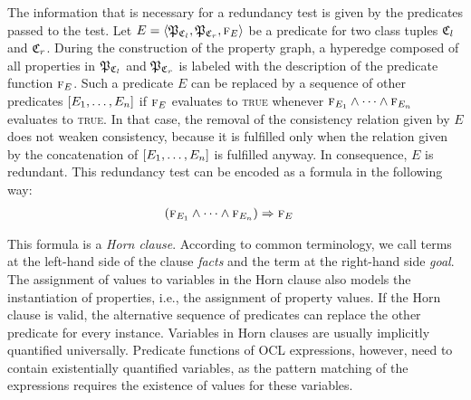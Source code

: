 The information that is necessary for a redundancy test is given by the predicates passed to the test.
Let $E = \tupled{\propertysettuple{P}{\classtuple{C}{l}}, \propertysettuple{P}{\classtuple{C}{r}}, \function{f}_E}$ be a predicate for two class tuples $\classtuple{C}{l}$ and $\classtuple{C}{r}$. 
During the construction of the property graph, a hyperedge composed of all properties in $\propertysettuple{P}{\classtuple{C}{l}}$ and $\propertysettuple{P}{\classtuple{C}{r}}$ is labeled with the description of the predicate function $\textsc{f}_E$.
Such a predicate $E$ can be replaced by a sequence of other predicates $[E_1, \dots, E_n]$ if $\textsc{f}_E$ evaluates to \textsc{true} whenever $\textsc{f}_{E_1} \wedge \dots \wedge \textsc{f}_{E_n}$ evaluates to \textsc{true}.
In that case, the removal of the consistency relation given by $E$ does not weaken consistency, because it is fulfilled only when  the relation given by the concatenation of $[E_1, \dots, E_n]$ is fulfilled anyway.
In consequence, $E$ is redundant.
This redundancy test can be encoded as a formula in the following way:
\begin{align*}
    &
    (\textsc{f}_{E_1} \wedge \dots \wedge \textsc{f}_{E_n}) \Rightarrow \textsc{f}_{E}
\end{align*}

This formula is a \emph{Horn clause}.
According to common terminology, we call terms at the left-hand side of the clause \emph{facts} and the term at the right-hand side \emph{goal}.
The assignment of values to variables in the Horn clause also models the instantiation of properties, i.e., the assignment of property values.
If the Horn clause is valid, the alternative sequence of predicates can replace the other predicate for every instance.
Variables in Horn clauses are usually implicitly quantified universally.
Predicate functions of \gls{OCL} expressions, however, need to contain existentially quantified \qvtr variables, as the pattern matching of the expressions requires the existence of values for these variables.

